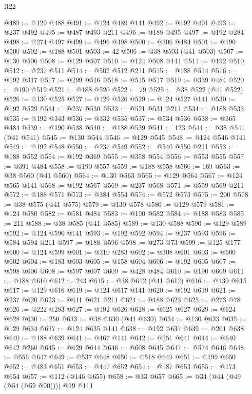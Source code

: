\begin{lexlean}{R22}
\begin{coremodule}
@489 := @129 @488
@491 := @124 @489 @141
@492 := @192 @491
@493 := @237 @492
@495 := @487 @493 @211
@496 := @188 @495
@497 := @192 @284
@498 := @274 @497
@499 := @496 @498
@500 := @306 @484
@501 := @190 @500
@502 := @188 @501
@503 := 42
@506 := @38 @503 (@41 @503)
@507 := @130 @506
@508 := @129 @507
@510 := @124 @508 @141
@511 := @192 @510
@512 := @237 @511
@514 := @502 @512 @211
@515 := @188 @514
@516 := @192 @317
@517 := @299 @516
@518 := @515 @517
@519 := @339 @484
@520 := @190 @519
@521 := @188 @520
@522 := 79
@525 := @38 @522 (@41 @522)
@526 := @130 @525
@527 := @129 @526
@529 := @124 @527 @141
@530 := @192 @529
@531 := @237 @530
@533 := @521 @531 @211
@534 := @188 @533
@535 := @192 @343
@536 := @332 @535
@537 := @534 @536
@538 := @365 @484
@539 := @190 @538
@540 := @188 @539
@541 := 123
@544 := @38 @541 (@41 @541)
@545 := @130 @544
@546 := @129 @545
@548 := @124 @546 @141
@549 := @192 @548
@550 := @237 @549
@552 := @540 @550 @211
@553 := @188 @552
@554 := @192 @369
@555 := @358 @554
@556 := @553 @555
@557 := @391 @484
@558 := @190 @557
@559 := @188 @558
@560 := 169
@563 := @38 @560 (@41 @560)
@564 := @130 @563
@565 := @129 @564
@567 := @124 @565 @141
@568 := @192 @567
@569 := @237 @568
@571 := @559 @569 @211
@572 := @188 @571
@573 := @384 @554
@574 := @572 @573
@575 := 200
@578 := @38 @575 (@41 @575)
@579 := @130 @578
@580 := @129 @579
@581 := @124 @580
@582 := @581 @484
@583 := @190 @582
@584 := @188 @583
@585 := 211
@588 := @38 @585 (@41 @585)
@589 := @130 @588
@590 := @129 @589
@592 := @124 @590 @141
@593 := @192 @592
@594 := @237 @593
@596 := @584 @594 @211
@597 := @188 @596
@598 := @273 @73
@599 := @125 @177
@600 := @124 @599
@601 := @310 @283
@602 := @308 @601
@603 := @600 @602
@604 := @183 @603
@605 := @158 @604
@606 := @192 @605
@607 := @598 @606
@608 := @597 @607
@609 := @428 @484
@610 := @190 @609
@611 := @188 @610
@612 := 243
@615 := @38 @612 (@41 @612)
@616 := @130 @615
@617 := @129 @616
@619 := @124 @617 @141
@620 := @192 @619
@621 := @237 @620
@623 := @611 @621 @211
@624 := @188 @623
@625 := @273 @78
@626 := @222 @283
@627 := @192 @626
@628 := @625 @627
@629 := @624 @628
@630 := 250
@633 := @38 @630 (@41 @630)
@634 := @130 @633
@635 := @129 @634
@637 := @124 @635 @141
@638 := @192 @637
@639 := @201 @638
@640 := @188 @639
@641 := @467 @141
@642 := @251 @641
@644 := @640 @642 @260
@645 := @629 @644
@646 := @608 @645
@647 := @574 @646
@648 := @556 @647
@649 := @537 @648
@650 := @518 @649
@651 := @499 @650
@652 := @483 @651
@653 := @447 @652
@654 := @187 @653
@655 := @173 @654
@657 := @112 (@146 @655)
@658 := @33 @657
@665 := @34 (@44 (@49 (@54 (@59 @90)))) @19 @111

\end{coremodule}
\end{lexlean}
